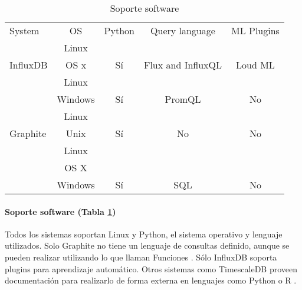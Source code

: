 \begin{table}[H]
    \begin{center}
        \begin{adjustbox}{max width=\textwidth}
            \begin{tabular}{l c c c c}
                \toprule
                System & OS & Python & Query language & ML Plugins\\
                \otoprule
                & Linux &                       &  \\
                \multirow{-2}{*}{InfluxDB} & OS x  & \multirow{-2}{*}{Sí} & \multirow{-2}{*}{Flux and InfluxQL} & \multirow{-2}{*}{Loud ML} \\
                \rowcolor{gray!35}
                                            & Linux   &                        & & \\
                \rowcolor{gray!35}
                \multirow{-2}{*}{Prometheus} & Windows & \multirow{-2}{*}{Sí}  & \multirow{-2}{*}{PromQL} & \multirow{-2}{*}{No}\\
                                        & Linux &                       &  & \\
                \multirow{-2}{*}{Graphite} & Unix  & \multirow{-2}{*}{Sí}  & \multirow{-2}{*}{No} & \multirow{-2}{*}{No} \\
                \rowcolor{gray!35}
                                            & Linux   &                             & & \\
                \rowcolor{gray!35}
                                            & OS X    &                             & & \\
                \rowcolor{gray!35}
                \multirow{-3}{*}{TimescaleDB} & Windows & \multirow{-3}{*}{Sí} & \multirow{-3}{*}{SQL} & \multirow{-3}{*}{No} \\
                \bottomrule
            \end{tabular}
        \end{adjustbox}
        \caption{Soporte software}
        \label{tabla:sssgbd}
    \end{center}
\end{table}

\paragraph*{Soporte software (Tabla \ref*{tabla:sssgbd})} Todos los sistemas soportan Linux y Python, el sistema operativo 
y lenguaje utilizados. Solo Graphite no tiene un lenguaje de consultas definido, aunque se pueden realizar utilizando lo que 
llaman Funciones \cite{graphite-functions}. Sólo InfluxDB soporta plugins para aprendizaje automático. Otros sistemas como
TimescaleDB proveen documentación para realizarlo de forma externa en lenguajes como Python o R \cite{timescale-forecasting}.

